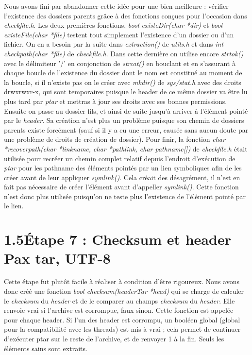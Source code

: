 \documentclass[12pt, a4paper]{report}
\begin{document}
\hspace{0.5cm}Nous avons fini par abandonner cette idée pour une bien meilleure : vérifier l'existence des dossiers parents grâce à des fonctions conçues pour l'occasion dans \textit{checkfile.h}. Les deux premières fonctions, \textit{bool existeDir(char *dir)} et \textit{bool existeFile(char *file)} testent tout simplement l'existence d'un dossier ou d'un fichier. On en a besoin par la suite dans \textit{extraction()} de \textit{utils.h} et dans \textit{int checkpath(char *file)} de \textit{checkfile.h}. Dans cette dernière on utilise encore \textit{strtok()} avec le délimiteur '/' en conjonction de \textit{strcat()} en bouclant et en s'assurant à chaque boucle de l'existence du dossier dont le nom est constitué au moment de la boucle, si il n'existe pas on le créer avec \textit{mkdir()} de \textit{sys/stat.h} avec des droits drwxrwxr-x, qui sont temporaires puisque le header de ce même dossier va être lu plus tard par \textit{ptar} et mettras à jour ses droits avec ses bonnes permissions. Ensuite on passe au dossier fils, et ainsi de suite jusqu'à arriver à l'élément pointé par le \textit{header}. Sa création n'est plus un problème puisque son chemin de dossiers parents existe forcément (sauf si il y a eu une erreur, causée sans aucun doute par une problème de droits de création de dossier). Pour finir, la fonction \textit{char *recoverpath(char *linkname, char *pathlink, char pathname[])} de \textit{checkfile.h} était utilisée pour recréer un chemin complet relatif depuis l'endroit d'exécution de \textit{ptar} pour les pathname des éléments pointés par un lien symboliques afin de les créer avant de leur appliquer \textit{symlink()}. Cela créait des désagrément, il n'est en fait pas nécessaire de créer l'élément avant d'appeller \textit{symlink()}. Cette fonction n'est donc plus utilisée puisqu'on ne teste plus l'existence de l'élément pointé par le lien.

\section*{\hspace{0.6cm}1.5\hspace{0.6cm}Étape 7 : Checksum et header Pax tar, UTF-8}

\hspace{0.5cm}Cette étape fut plutôt facile à réaliser à condition d'être rigoureux. Nous avons donc créé une fonction \textit{bool checksum(headerTar *head)} qui se charge de calculer le \textit{checksum} du \textit{header} et de le comparer au champs \textit{checksum} du \textit{header}. Elle renvoie vrai si l'archive est corrompue, faux sinon. Cette fonction est appelée pour chaque header. Si l'un des header est corrompu, un booléen global (global pour la compatibilité avec les threads) est mis à vrai ; cela permet de continuer d'exécuter ptar sur le reste de l'archive, et de renvoyer 1 à la fin. Seuls les éléments sains sont extraits.\\
\end{document}
